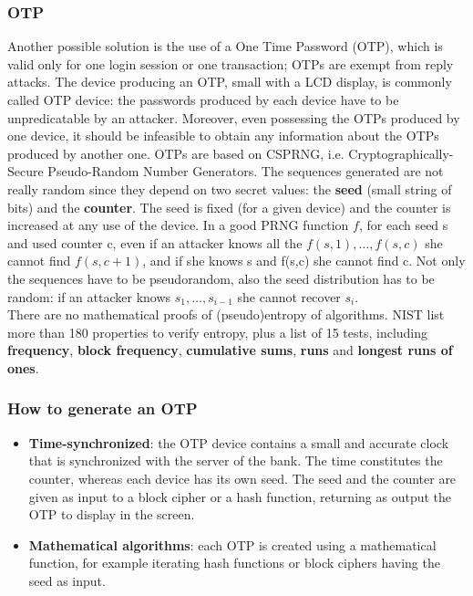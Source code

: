 \documentclass[a4paper, 10pt, titlepage]{article}
\begin{document}
\subsubsection{OTP}
Another possible solution is the use of a One Time Password (OTP), which is valid only for one login session or one transaction; OTPs are exempt from reply attacks. The device producing an OTP, small with a LCD display, is commonly called OTP device: the passwords produced by each device have to be unpredicatable by an attacker. Moreover, even possessing the OTPs produced by one device, it should be infeasible to obtain any information about the OTPs produced by another one. OTPs are based on CSPRNG, i.e. Cryptographically-Secure Pseudo-Random Number Generators. The sequences generated are not really random since they depend on two secret values: the \textbf{seed} (small string of bits) and the \textbf{counter}. The seed is fixed (for a given device) and the counter is increased at any use of the device. In a good PRNG function $f$, for each seed s and used counter c, even if an attacker knows all the $f(s,1), \dots, f(s,c)$ she cannot find $f(s, c+1)$, and if she knows s and f(s,c) she cannot find c. Not only the sequences have to be pseudorandom, also the seed distribution has to be random: if an attacker knows $s_1, \dots, s_{i-1}$ she cannot recover $s_i$. \medskip\\
There are no mathematical proofs of (pseudo)entropy of algorithms. NIST list more than 180 properties to verify entropy, plus a list of 15 tests, including \textbf{frequency}, \textbf{block frequency}, \textbf{cumulative sums}, \textbf{runs} and \textbf{longest runs of ones}.

\subsubsection*{How to generate an OTP}
\begin{itemize}
\item \textbf{Time-synchronized}: the OTP device contains a small and accurate clock that is synchronized with the server of the bank. The time constitutes the counter, whereas each device has its own seed. The seed and the counter are given as input to a block cipher or a hash function, returning as output the OTP to display in the screen.
\item \textbf{Mathematical algorithms}: each OTP is created using a mathematical function, for example iterating hash functions or block ciphers having the seed as input.
\end{itemize}
\end{document}

